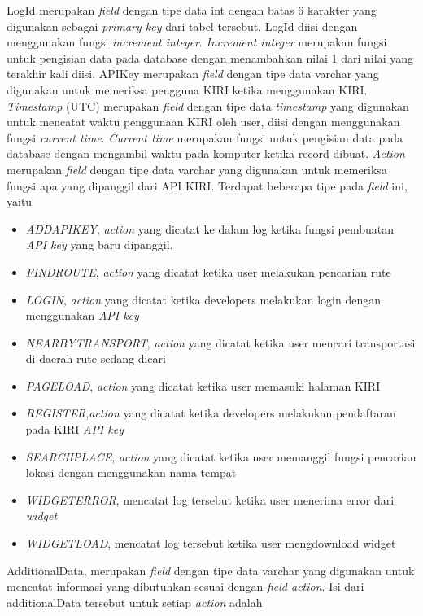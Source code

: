 LogId merupakan \textsl{field} dengan tipe data int dengan batas 6 karakter yang digunakan sebagai \textsl{primary key} dari tabel tersebut. LogId diisi dengan menggunakan fungsi \textsl{increment integer}. \textsl{Increment integer} merupakan fungsi untuk pengisian data pada database dengan menambahkan nilai 1 dari nilai yang terakhir kali diisi.
APIKey merupakan \textsl{field} dengan tipe data varchar yang digunakan untuk memeriksa pengguna KIRI ketika menggunakan KIRI.
\textsl{Timestamp} (UTC) merupakan \textsl{field} dengan tipe data \textsl{timestamp} yang digunakan untuk mencatat waktu penggunaan KIRI oleh user, diisi dengan menggunakan fungsi \textsl{current time}. \textsl{Current time} merupakan fungsi untuk pengisian data pada database dengan mengambil waktu pada komputer ketika record dibuat.
\textsl{Action} merupakan \textsl{field} dengan tipe data varchar yang digunakan untuk memeriksa fungsi apa yang dipanggil dari API KIRI. Terdapat beberapa tipe pada \textsl{field} ini, yaitu
\begin{itemize}
	\item \textsl{ADDAPIKEY}, \textsl{action} yang dicatat ke dalam log ketika fungsi pembuatan \textsl{API key} yang baru dipanggil.
	\item \textsl{FINDROUTE}, \textsl{action} yang dicatat ketika user melakukan pencarian rute
	\item \textsl{LOGIN}, \textsl{action} yang dicatat ketika developers melakukan login dengan menggunakan \textsl{API key}
	\item \textsl{NEARBYTRANSPORT}, \textsl{action} yang dicatat ketika user mencari transportasi di daerah rute sedang dicari
	\item \textsl{PAGELOAD}, \textsl{action} yang dicatat ketika user memasuki halaman KIRI
 	\item \textsl{REGISTER},\textsl{action} yang dicatat ketika developers melakukan pendaftaran pada KIRI \textsl{API key}
	\item \textsl{SEARCHPLACE}, \textsl{action} yang dicatat ketika user memanggil fungsi pencarian lokasi dengan menggunakan nama tempat
	\item \textsl{WIDGETERROR}, mencatat log tersebut ketika user menerima error dari \textit{widget}
	\item \textsl{WIDGETLOAD}, mencatat log tersebut ketika user mengdownload widget
\end{itemize}
AdditionalData, merupakan \textsl{field} dengan tipe data varchar yang digunakan untuk mencatat informasi yang dibutuhkan sesuai dengan \textsl{field action}. Isi dari additionalData tersebut untuk setiap \textsl{action} adalah
